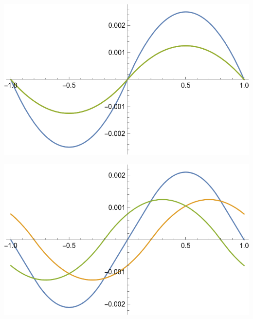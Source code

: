 \documentclass[10pt]{article}
\begin{document}
\begin{center}
    \begin{minipage}{0.48\linewidth}
        \includegraphics[width=\textwidth]{IMG/3-0.0.png}
    \end{minipage}
    \hfill
    \begin{minipage}{0.49\linewidth}
        \includegraphics[width=\textwidth]{IMG/3-0.2.png}
    \end{minipage}
\end{center}
\end{document}
